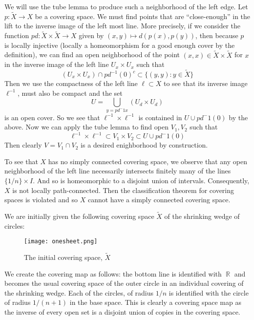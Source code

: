 \documentclass{article}
\DeclareMathOperator{\R}{\mathbb{R}}
\DeclareMathOperator{\suchthat}{\mathrel{:}}
\newcommand{\exercise}[1]{\noindent{\textbf{Exercise #1:}}}
\begin{document}
\exercise{1.3.5}

We will use the tube lemma to produce such a neighborhood of the left
edge. Let $p: \tilde{X} \to X$ be a covering space. We must find
points that are ``close-enough'' in the lift to the inverse image of
the left most line. More precisely, if we consider the function $pd:
\tilde{X}\times \tilde{X} \to X$ given by $(x,y) \mapsto
d(p(x),p(y))$, then because $p$ is locally injective (locally a
homeomorphism for a good enough cover by the definition), we can find
an open neighborhood of the point $(x,x) \in \tilde{X}\times
\tilde{X}$ for $x$ in the inverse image of the left line $U_x \times
U_x$ such that
\[
(U_x \times U_x) \cap pd^{-1}(0)^c \subset \{(y,y) \suchthat y\in \tilde{X}\}
\]
Then we use the compactness of the left line $\ell \subset X$ to see
that its inverse image $\ell^{-1}$, must also be compact and the set
\[
U = \bigcup_{y = pd^-1{x}} (U_d \times U_d)
\]
is an open cover. So we see that $\ell^{-1}\times \ell^{-1}$ is
contained in $U \cup pd^-1(0)$ by the above. Now we can apply the tube
lemma to find open $V_1,V_2$ such that
\[
\ell^{-1}\times \ell^{-1} \subset V_1 \times V_2 \subset U \cup pd^-1(0)
\]
Then clearly $V = V_1 \cap V_2$ is a desired enighborhood by
construction.

To see that $X$ has no simply connected covering space, we observe
that any open neighborhood of the left line necessarily intersects
finitely many of the lines $\{1/n\} \times I$. And so is homeomorphic
to a disjoint union of intervals. Consequently, $X$ is not locally
path-connected. Then the classification theorem for covering spaces is
violated and so $X$ cannot have a simply connected covering space.

\exercise{1.3.6}

We are initially given the following covering space $\tilde{X}$ of the
shrinking wedge of circles:
\begin{figure}[h!]
  \centering
  \texttt{[image: onesheet.png]}
  \caption{The initial covering space, $\tilde{X}$}
\end{figure}

We create the covering map as follows: the bottom line is identified
with $\R$ and becomes the usual covering space of the outer circle in
an individual covering of the shrinking wedge. Each of the circles, of
radius $1/n$ is identified with the circle of radius $1/(n+1)$ in the
base space. This is clearly a covering space map as the inverse of
every open set is a disjoint union of copies in the covering space.
\end{document}
